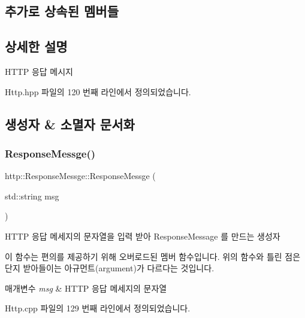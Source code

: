 \subsection*{추가로 상속된 멤버들}


\subsection{상세한 설명}
H\+T\+TP 응답 메시지 

Http.\+hpp 파일의 120 번째 라인에서 정의되었습니다.



\subsection{생성자 \& 소멸자 문서화}
\mbox{\label{classhttp_1_1_response_messge_a20f120ead2d600fc033c3f5ce3d5174e}} 
\subsubsection{\texorpdfstring{Response\+Messge()}{ResponseMessge()}\hspace{0.1cm}{\footnotesize\ttfamily [1/2]}}
{\footnotesize\ttfamily http\+::\+Response\+Messge\+::\+Response\+Messge (\begin{DoxyParamCaption}\item[{std\+::string}]{msg }\end{DoxyParamCaption})}



H\+T\+TP 응답 메세지의 문자열을 입력 받아 Response\+Message 를 만드는 생성자 

이 함수는 편의를 제공하기 위해 오버로드된 멤버 함수입니다. 위의 함수와 틀린 점은 단지 받아들이는 아규먼트(argument)가 다르다는 것입니다. 
\begin{DoxyParams}{매개변수}
{\em msg} & H\+T\+TP 응답 메세지의 문자열 \\
\hline
\end{DoxyParams}


Http.\+cpp 파일의 129 번째 라인에서 정의되었습니다.

\mbox{\label{classhttp_1_1_response_messge_a278fe12044ee4b4d69b75b3bf6dbe652}} 
